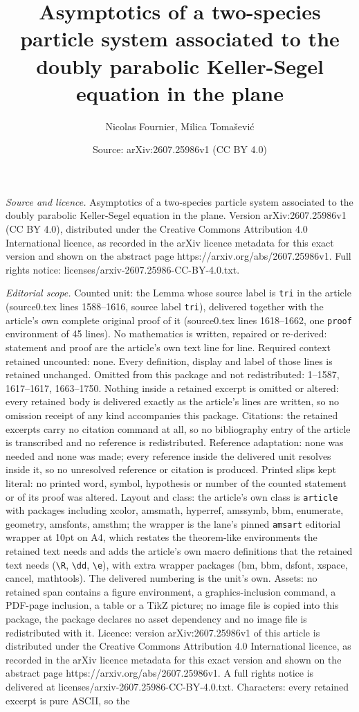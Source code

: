 \documentclass[10pt,a4paper]{amsart}
\title[Asymptotics of a two-species particle system associated to t]{Asymptotics of a two-species particle system associated to the doubly parabolic Keller-Segel equation in the plane}
\author{Nicolas Fournier, Milica Toma\v{s}evi\'c}
\date{Source: arXiv:2607.25986v1 (CC BY 4.0)}
\begin{document}
\maketitle

\noindent\emph{Source and licence.} Asymptotics of a two-species particle system associated to the doubly parabolic Keller-Segel equation in the plane. Version arXiv:2607.25986v1 (CC BY 4.0), distributed under the Creative Commons Attribution 4.0 International licence, as recorded in the arXiv licence metadata for this exact version and shown on the abstract page https://arxiv.org/abs/2607.25986v1. Full rights notice: licenses/arxiv-2607.25986-CC-BY-4.0.txt.\par\smallskip

\noindent\textit{Editorial scope.} Counted unit: the Lemma whose source label is \texttt{tri} in the article (source0.tex lines 1588--1616, source label \texttt{tri}), delivered together with the article's own complete original proof of it (source0.tex lines 1618--1662, one \texttt{proof} environment of 45 lines). No mathematics is written, repaired or re-derived: statement and proof are the article's own text line for line. Required context retained uncounted: none. Every definition, display and label of those lines is retained unchanged. Omitted from this package and not redistributed: 1--1587, 1617--1617, 1663--1750. Nothing inside a retained excerpt is omitted or altered: every retained body is delivered exactly as the article's lines are written, so no omission receipt of any kind accompanies this package. Citations: the retained excerpts carry no citation command at all, so no bibliography entry of the article is transcribed and no reference is redistributed. Reference adaptation: none was needed and none was made; every reference inside the delivered unit resolves inside it, so no unresolved reference or citation is produced. Printed slips kept literal: no printed word, symbol, hypothesis or number of the counted statement or of its proof was altered. Layout and class: the article's own class is \texttt{article} with packages including xcolor, amsmath, hyperref, amssymb, bbm, enumerate, geometry, amsfonts, amsthm; the wrapper is the lane's pinned \texttt{amsart} editorial wrapper at 10pt on A4, which restates the theorem-like environments the retained text needs and adds the article's own macro definitions that the retained text needs (\texttt{\textbackslash R}, \texttt{\textbackslash dd}, \texttt{\textbackslash e}), with extra wrapper packages (bm, bbm, dsfont, xspace, cancel, mathtools). The delivered numbering is the unit's own. Assets: no retained span contains a figure environment, a graphics-inclusion command, a PDF-page inclusion, a table or a TikZ picture; no image file is copied into this package, the package declares no asset dependency and no image file is redistributed with it. Licence: version arXiv:2607.25986v1 of this article is distributed under the Creative Commons Attribution 4.0 International licence, as recorded in the arXiv licence metadata for this exact version and shown on the abstract page https://arxiv.org/abs/2607.25986v1. A full rights notice is delivered at licenses/arxiv-2607.25986-CC-BY-4.0.txt. Characters: every retained excerpt is pure ASCII, so the 
\end{document}
